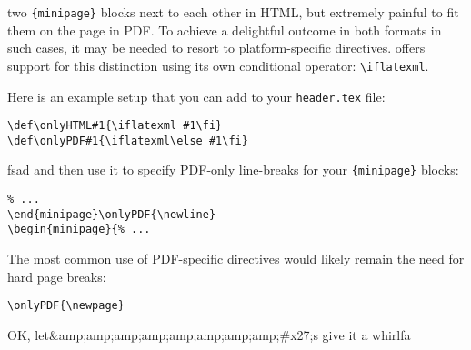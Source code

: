 two \verb|{minipage}| blocks next to each other in HTML, but extremely painful to fit them on the page in PDF. To achieve a delightful outcome in both formats in such cases, it may be needed to resort to platform-specific directives. \latexml offers support for this distinction using its own conditional operator: \verb|\iflatexml|.

Here is an example setup that you can add to your \verb|header.tex| file:
\begin{lstlisting}
\def\onlyHTML#1{\iflatexml #1\fi}
\def\onlyPDF#1{\iflatexml\else #1\fi}
\end{lstlisting}
fsad
and then use it to specify PDF-only line-breaks for your \verb|{minipage}| blocks:
\begin{lstlisting}
% ...
\end{minipage}\onlyPDF{\newline}
\begin{minipage}{% ...
\end{lstlisting}

The most common use of PDF-specific directives would likely remain the need for hard page breaks:
\begin{lstlisting}
\onlyPDF{\newpage}
\end{lstlisting} OK, let&amp;amp;amp;amp;amp;amp;amp;amp;#x27;s give it a whirlfa